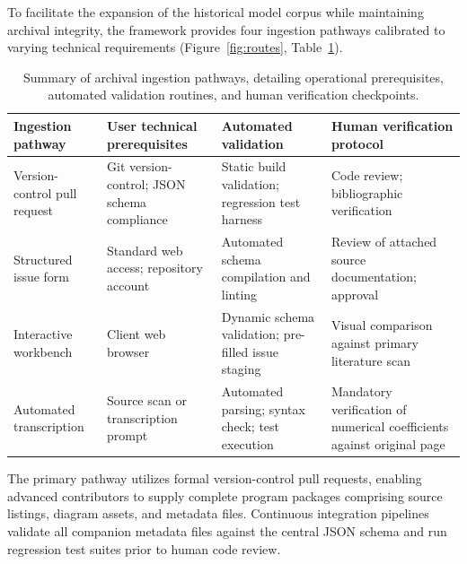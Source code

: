 \documentclass[11pt,a4paper]{article}
\begin{document}
To facilitate the expansion of the historical model corpus while maintaining archival integrity, the framework provides four ingestion pathways calibrated to varying technical requirements (Figure~\ref{fig:routes}, Table~\ref{tab:routes}).

\begin{table}[h]
\centering\small
\begin{tabularx}{\linewidth}{@{}lXXX@{}}
\toprule
Ingestion pathway & User technical prerequisites & Automated validation & Human verification protocol \\
\midrule
Version-control pull request & Git version-control; JSON schema compliance & Static build validation; regression test harness & Code review; bibliographic verification \\
Structured issue form & Standard web access; repository account & Automated schema compilation and linting & Review of attached source documentation; approval \\
Interactive workbench & Client web browser & Dynamic schema validation; pre-filled issue staging & Visual comparison against primary literature scan \\
Automated transcription & Source scan or transcription prompt & Automated parsing; syntax check; test execution & Mandatory verification of numerical coefficients against original page \\
\bottomrule
\end{tabularx}
\caption{Summary of archival ingestion pathways, detailing operational prerequisites, automated validation routines, and human verification checkpoints.}
\label{tab:routes}
\end{table}

The primary pathway utilizes formal version-control pull requests, enabling advanced contributors to supply complete program packages comprising source listings, diagram assets, and metadata files. Continuous integration pipelines validate all companion metadata files against the central JSON schema and run regression test suites prior to human code review.
\end{document}

